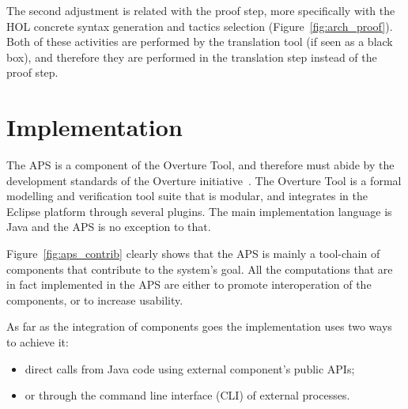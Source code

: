 \documentclass[]{article}
\begin{document}
The second adjustment is related with the proof step, more specifically with the HOL concrete syntax generation and tactics selection (Figure~\ref{fig:arch_proof}).
Both of these activities are performed by the translation tool (if seen as a black box), and therefore they are performed in the translation step instead of the proof step.

\section{Implementation}
\label{sec:implementation}

The APS is a component of the Overture Tool, and therefore must abide by the development standards of the Overture initiative~\cite{LarsenBFL08}.
The Overture Tool is a formal modelling and verification tool suite that is modular, and integrates in the Eclipse platform through several plugins.
The main implementation language is Java and the APS is no exception to that.

Figure~\ref{fig:aps_contrib} clearly shows that the APS is mainly a tool-chain of components that contribute to the system's goal.
All the computations that are in fact implemented in the APS are either to promote interoperation of the components, or to increase usability.

As far as the integration of components goes the implementation uses two ways to achieve it:
\begin{itemize}
  \item direct calls from Java code using external component's public APIs;
  \item or through the command line interface (CLI) of external processes.
\end{itemize}
\end{document}
